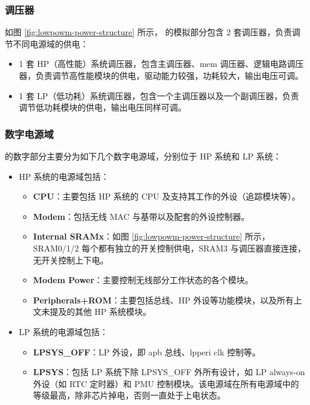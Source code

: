 \documentclass[main\_\_CN.tex]{subfiles}
\begin{document}
\subsubsection{调压器}\label{sec:lowpowm-regulators}

如图 \ref{fig:lowpowm-power-structure} 所示，\chipname{} 的模拟部分包含 2 套调压器，负责调节不同电源域的供电：

\begin{itemize}
    \item 1 套 HP（高性能）系统调压器，包含主调压器、mem 调压器、逻辑电路调压器，负责调节高性能模块的供电，驱动能力较强，功耗较大，输出电压可调。
    \item 1 套 LP（低功耗）系统调压器，包含一个主调压器以及一个副调压器，负责调节低功耗模块的供电，输出电压同样可调。
\end{itemize}


\subsubsection{数字电源域}\label{sec:lowpowm_digital_domain}

\chipname{} 的数字部分主要分为如下几个数字电源域，分别位于 HP 系统和 LP 系统：

\begin{itemize}
    \item HP 系统的电源域包括：
    \begin{itemize}
        \item \textbf{CPU}：主要包括 HP 系统的 CPU 及支持其工作的外设（追踪模块等）。
        \item \textbf{Modem}：包括无线 MAC 与基带以及配套的外设控制器。
        \item \textbf{Internal SRAMx}：如图 \ref{fig:lowpowm-power-structure} 所示，SRAM0/1/2 每个都有独立的开关控制供电，SRAM3 与调压器直接连接，无开关控制上下电。
        \item \textbf{Modem Power}：主要控制无线部分工作状态的各个模块。
        \item \textbf{Peripherals+ROM}：主要包括总线、HP 外设等功能模块，以及所有上文未提及的其他 HP 系统模块。
    \end{itemize}
    \item LP 系统的电源域包括：
    \begin{itemize}
        \item \textbf{LPSYS\_OFF}：LP 外设，即 apb 总线、lpperi clk 控制等。
        \item \textbf{LPSYS}：包括 LP 系统下除 LPSYS\_OFF 外所有设计，如 LP always-on 外设（如 RTC 定时器）和 PMU 控制模块。该电源域在所有电源域中的等级最高，除非芯片掉电，否则一直处于上电状态。
    \end{itemize}
\end{itemize}
\end{document}
